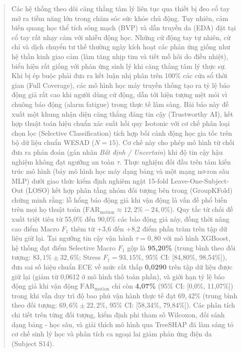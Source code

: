 \documentclass[conference]{IEEEtran}
\begin{document}
\begin{abstract}
Các hệ thống theo dõi căng thẳng tâm lý liên tục qua thiết bị đeo cổ tay mở ra tiềm năng lớn trong chăm sóc sức khỏe chủ động. Tuy nhiên, cảm biến quang học thể tích sóng mạch (BVP) và dẫn truyền da (EDA) đặt tại cổ tay rất nhạy cảm với nhiễu động học. Những cử động tay tự nhiên, cử chỉ và dịch chuyển tư thế thường ngày kích hoạt các phản ứng giống như hệ thần kinh giao cảm (làm tăng nhịp tim và tiết mồ hôi do điều nhiệt), biểu hiện rất giống với phản ứng sinh lý khi căng thẳng tâm lý thực sự. Khi bị ép buộc phải đưa ra kết luận nhị phân trên 100\% các cửa sổ thời gian (Full Coverage), các mô hình học máy truyền thống tạo ra tỷ lệ báo động giả rất cao khi người dùng cử động, dẫn tới hiện tượng mệt mỏi vì chuông báo động (alarm fatigue) trong thực tế lâm sàng. Bài báo này đề xuất một khung nhận diện căng thẳng đáng tin cậy (Trustworthy AI), kết hợp thuật toán hiệu chuẩn xác suất hồi quy Isotonic với cơ chế phân loại chọn lọc (Selective Classification) tích hợp bối cảnh động học gia tốc trên bộ dữ liệu chuẩn WESAD ($N=15$). Cơ chế này cho phép mô hình từ chối đưa ra phán đoán (gán nhãn \textit{Bất định / Uncertain}) khi độ tin cậy hậu nghiệm không đạt ngưỡng an toàn $\tau$. Thực nghiệm đối đầu trên tám kiến trúc mô hình (bảy mô hình học máy dạng bảng và một mạng nơ-ron sâu MLP) dưới giao thức kiểm định nghiêm ngặt 15-fold Leave-One-Subject-Out (LOSO) kết hợp phân tầng nhóm đối tượng bên trong (GroupKFold) chứng minh rằng: lỗ hổng báo động giả khi vận động là vấn đề phổ biến trên mọi họ thuật toán ($\text{FAR}_{\text{motion}} \approx 12,2\% - 24,0\%$). Quy tắc từ chối đề xuất triệt tiêu từ 55,0\% đến 90,0\% các báo động giả này, đồng thời nâng cao điểm Macro $F_1$ thêm từ +3,6 đến +8,2 điểm phần trăm trên tập dữ liệu giữ lại. Tại ngưỡng tin cậy vận hành $\tau = 0,80$ với mô hình XGBoost, hệ thống đạt điểm Selective Macro $F_1$ gộp là \textbf{95,20\%} (trung bình theo đối tượng: $83,1\% \pm 32,6\%$; Stress $F_1 = 93,15\%$, 95\% CI: [84,80\%, 98,54\%]), đưa sai số hiệu chuẩn ECE về mức rất thấp \textbf{0,0290} trên tập dữ liệu được giữ lại (giảm từ 0,0612 ở mô hình thô toàn phần), và giới hạn tỷ lệ báo động giả khi vận động $\text{FAR}_{\text{motion}}$ chỉ còn \textbf{4,07\%} (95\% CI: [0,0\%, 11,07\%]) trong khi vẫn duy trì độ bao phủ vận hành thực tế đạt $69,42\%$ (trung bình theo đối tượng: $69,6\% \pm 22,2\%$, 95\% CI: [58,34\%, 79,84\%]). Các phân tích chi tiết trên từng đối tượng, kiểm định phi tham số Wilcoxon, đối sánh dạng bảng - học sâu, và giải thích mô hình qua TreeSHAP đã làm sáng tỏ cơ chế sinh lý học và phân tích ca ngoại lai giảm phản ứng điện da (Subject S14).
\end{abstract}
\end{document}

